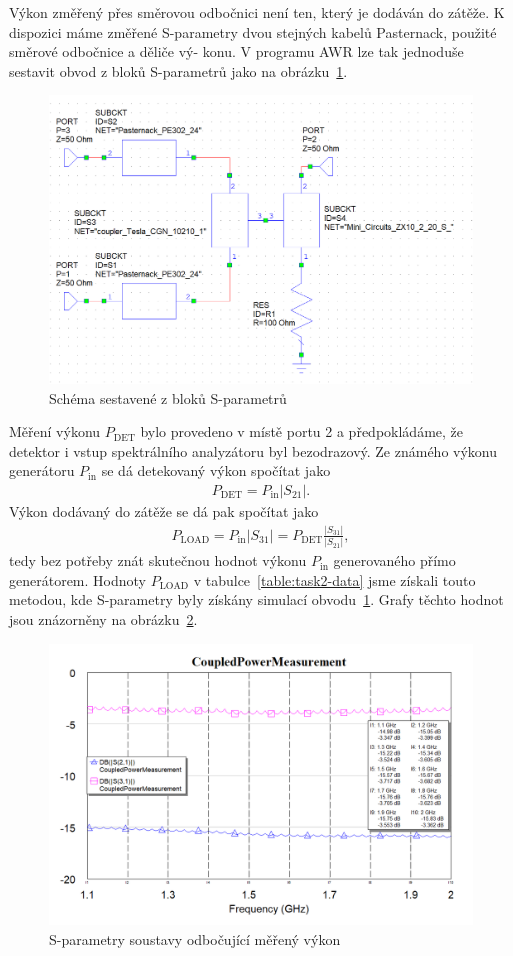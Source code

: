 \documentclass[11pt,a4paper]{article}
\begin{document}
Výkon změřený přes směrovou odbočnici není ten, který je dodáván do zátěže. K dispozici máme
změřené S-parametry dvou stejných kabelů Pasternack, použité směrové odbočnice a děliče vý-
konu. V programu AWR lze tak jednoduše sestavit obvod z bloků S-parametrů jako na obrázku~\ref{fig:task2-sparametry}.
\begin{figure}[!ht]
    \centering
    \includegraphics[width=.8\textwidth]{src/task2-sparametry.png}
    \caption{Schéma sestavené z bloků S-parametrů}
    \label{fig:task2-sparametry}
\end{figure}
Měření výkonu $P_{\mathrm{DET}}$ bylo provedeno v místě portu 2 a předpokládáme, že detektor i vstup spektrálního analyzátoru byl bezodrazový. Ze známého výkonu generátoru $P_{\mathrm{in}}$ se dá detekovaný výkon spočítat jako
\begin{align}
    P_{\mathrm{DET}} = P_{\mathrm{in}} \left|S_{21}\right|.
\end{align}
Výkon dodávaný do zátěže se dá pak spočítat jako
\begin{align}
    P_{\mathrm{LOAD}} = P_{\mathrm{in}} \left|S_{31}\right| = P_{\mathrm{DET}} \frac{\left|S_{31}\right|}{\left|S_{21}\right|},
\end{align}
tedy bez potřeby znát skutečnou hodnot výkonu $P_{\mathrm{in}}$ generovaného přímo generátorem. Hodnoty $P_{\mathrm{LOAD}}$ v tabulce~\ref{table:task2-data} jsme získali touto metodou, kde S-parametry byly získány simulací obvodu~\ref{fig:task2-sparametry}. Grafy těchto hodnot jsou znázorněny na obrázku~\ref{fig:task2-sparameter-data}.
\begin{figure}[!ht]
    \centering
    \includegraphics[width=.8\textwidth]{src/task2-sparameter_data.png}
    \caption{S-parametry soustavy odbočující měřený výkon}
    \label{fig:task2-sparameter-data}
\end{figure}
\end{document}
